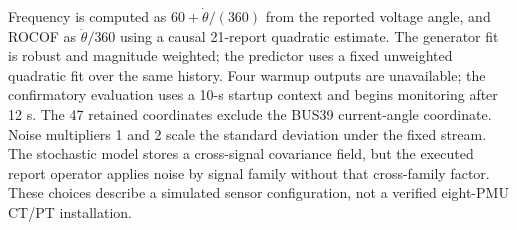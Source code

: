 Frequency is computed as $60+\dot\theta/(360)$ from the reported voltage angle, and ROCOF as $\ddot\theta/360$ using a causal 21-report quadratic estimate. The generator fit is robust and magnitude weighted; the predictor uses a fixed unweighted quadratic fit over the same history. Four warmup outputs are unavailable; the confirmatory evaluation uses a 10-s startup context and begins monitoring after 12 s. The 47 retained coordinates exclude the BUS39 current-angle coordinate. Noise multipliers 1 and 2 scale the standard deviation under the fixed stream. The stochastic model stores a cross-signal covariance field, but the executed report operator applies noise by signal family without that cross-family factor. These choices describe a simulated sensor configuration, not a verified eight-PMU CT/PT installation.
